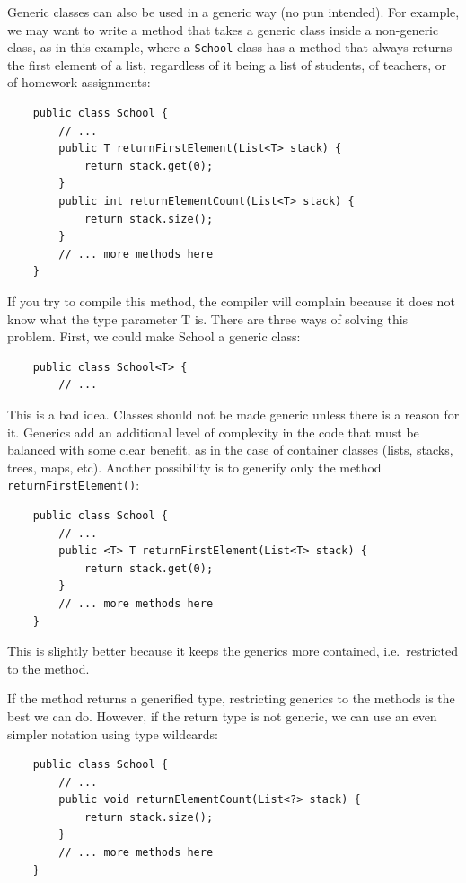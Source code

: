 Generic classes can also be used in a generic way (no pun
intended). For example, we may want to write a method that takes a
generic class inside a non-generic class, as in this example, where a
\verb+School+ class has a method that always returns the first element
of a list, regardless of it being a list of students, of teachers, or of
homework assignments: 

\begin{verbatim}
    public class School {
        // ...
        public T returnFirstElement(List<T> stack) {
            return stack.get(0); 
        }
        public int returnElementCount(List<T> stack) {
            return stack.size();
        }
        // ... more methods here
    }
\end{verbatim}

If you try to compile this method, the compiler will complain because
it does not know what the type parameter T is. There are three ways of
solving this problem. First, we could make School a generic class: 

\begin{verbatim}
    public class School<T> {
        // ...
\end{verbatim}

This is a bad idea. Classes should not be made generic unless there is
a reason for it. Generics add an additional level of complexity in the
code that must be balanced with some clear benefit, as in the case of
container classes (lists, stacks, trees, maps, etc). Another
possibility is to generify only the method
\verb+returnFirstElement()+: 

\begin{verbatim}
    public class School {
        // ...
        public <T> T returnFirstElement(List<T> stack) {
            return stack.get(0); 
        }
        // ... more methods here
    }
\end{verbatim}

This is slightly better because it keeps the generics more
contained, i.e.~restricted to the method. 

If the method returns a generified type, restricting generics to the
methods is the best
we can do. However, if the return type is not generic, 
we can use an even simpler notation using type wildcards: 

\begin{verbatim}
    public class School {
        // ...
        public void returnElementCount(List<?> stack) {
            return stack.size();
        }
        // ... more methods here
    }
\end{verbatim}

